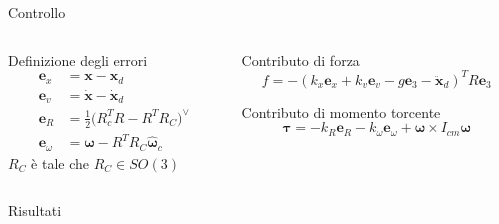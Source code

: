 \documentclass[]{beamer}
\begin{document}
	\begin{frame}{Controllo}
		\centering
		\begin{columns}
			\begin{column}{.45\textwidth}
				\setlength\abovedisplayskip{-10pt}
				\centering
				\begin{block}{Definizione degli errori}
					\begin{align*}
						\mathbf{e}_x &= \mathbf{x} - \mathbf{x}_d \\ 
						\mathbf{e}_v &= \dot{\mathbf{x}} - \dot{\mathbf{x}}_d \\
						\mathbf{e}_R &= \frac{1}{2}\bigl(R_c^TR-R^TR_C \bigl)^{\vee} \\
						\mathbf{e}_{\omega} &= \boldsymbol{\omega} - R^TR_C\hat{\boldsymbol{\omega}}_c
					\end{align*}
					$R_C$ è tale che $R_C \in SO(3)$
				\end{block}
			\end{column}
			\begin{column}{.55\textwidth}
				\centering
				\begin{block}{Contributo di forza}
					\setlength\abovedisplayskip{-10pt}
					\begin{equation*}
						f = -(k_x\mathbf{e}_x+k_v\mathbf{e}_v-g\mathbf{e}_3-\ddot{\mathbf{x}}_d)^TR\mathbf{e}_3
					\end{equation*}
				\end{block}
				\begin{block}{Contributo di momento torcente}
					\setlength\abovedisplayskip{-10pt}
					\begin{equation*}
						\boldsymbol{\tau} = -k_R\mathbf{e}_R - k_{\omega}\boldsymbol{e}_{\omega} + \boldsymbol{\omega}\times I_{cm}\boldsymbol{\omega}
					\end{equation*}
				\end{block}
			\end{column}
		\end{columns}
		\begin{figure}
			
		\end{figure}
	\end{frame}
	
	\begin{frame}{Risultati}
		\centering
		\begin{figure}
			
		\end{figure}
	\end{frame}
	
\end{document}
